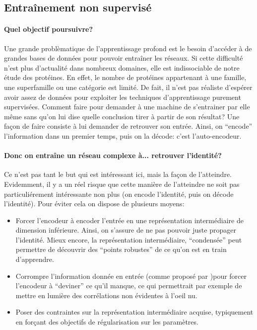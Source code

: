 \documentclass[a4paper, 11pt, onecolumn]{article}
\begin{document}
\subsection{Entraînement non supervisé}

\paragraph{Quel objectif poursuivre?}

Une grande problèmatique de l'apprentissage profond est le besoin d'accéder à de
grandes bases de données pour pouvoir entraîner les réseaux. Si cette difficulté
n'est plus d'actualité dans nombreux domaines, elle est indissociable de notre
étude des protéines. En effet, le nombre de protéines appartenant à une famille,
une superfamille ou une catégorie est limité. De fait, il n'est pas réaliste
d'espérer avoir assez de données pour exploiter les techniques d'apprentissage
purement supervisées. Comment faire pour demander à une machine de s'entrainer par elle même sans
qu'on lui dise quelle conclusion tirer à partir de son résultat? Une façon de
faire consiste à lui demander de retrouver son entrée. Ainsi, on ``encode''
l'information dans un premier temps, puis on la \og décode\fg : c'est l'auto-encodeur.

\paragraph{Donc on entraîne un réseau complexe à... retrouver l'identité?}

Ce n'est pas tant le but qui est intéressant ici, mais la façon de l'atteindre.
Evidemment, il y a un réel risque que cette manière de l'atteindre ne soit pas
particuliérement intéressante non plus (on encode l'identité, puis on décode
l'identité). Pour éviter cela on dispose de plusieurs moyens:

\begin{itemize}
\item Forcer l'encodeur à encoder l'entrée en une représentation intermédiaire
  de dimension inférieure. Ainsi, on s'assure de ne pas pouvoir juste propager
  l'identité. Mieux encore, la représentation intermédiaire, ``condensée'' peut
  permettre de découvrir des ``points robustes'' de ce qu'on est en train
  d'apprendre.
\item Corrompre l'information donnée en entrée (comme proposé par \cite{Vincent:2008:ECR:1390156.1390294})pour forcer l'encodeur à
  ``deviner'' ce qu'il manque, ce qui permettrait par exemple de mettre en
  lumière des corrélations non évidentes à l'oeil nu.
\item Poser des contraintes sur la représentation intermédiaire acquise,
  typiquement en forçant des objectifs de régularisation sur les paramètres.
\end{itemize}
\end{document}
